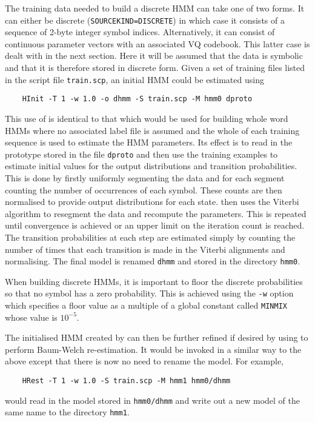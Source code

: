 The training data needed to build a discrete HMM can take one of two forms. It
can either be discrete (\texttt{SOURCEKIND=DISCRETE}) in which case it consists
of a sequence of 2-byte integer symbol indices.  Alternatively, it can consist
of continuous parameter vectors with an associated VQ codebook.  This latter
case is dealt with in the next section.  Here it will be assumed that the data
is symbolic and that it is therefore stored in discrete form. Given a set of training files listed in the script file
\texttt{train.scp}, an initial HMM could be estimated using
\begin{verbatim}
    HInit -T 1 -w 1.0 -o dhmm -S train.scp -M hmm0 dproto
\end{verbatim}
This use of  is identical to that which would be
used for building whole word HMMs where no associated label file is
assumed and the whole of each training sequence is used to estimate
the HMM parameters.  Its effect is to read in the prototype
stored in the file \texttt{dproto} and then use the training examples
to estimate initial values for the output distributions
and transition probabilities.  This is done by firstly uniformly 
segmenting the data and for each segment counting the number of occurrences
of each symbol.  These counts are then normalised to provide output distributions
for each state.   then uses the Viterbi algorithm to resegment
the data and recompute the parameters.  This is repeated until convergence
is achieved or an upper limit on the iteration count is reached.
The transition probabilities at each step are estimated simply by
counting the number of times that each transition is made in the Viterbi alignments
and normalising.  The final model is renamed \texttt{dhmm} and stored in
the directory \texttt{hmm0}.

When building discrete HMMs, it is important to floor the discrete
probabilities so that no symbol has a zero probability.  This is 
achieved using the \texttt{-w} option which specifies a floor value
as a multiple of a global constant called \texttt{MINMIX} whose
value is $10^{-5}$. 

The initialised HMM created by  
can then be further refined if desired by using 
to perform Baum-Welch re-estimation.  It would be invoked in a similar
way to the above except that there is now no need to rename the model.
For example,
\begin{verbatim}
    HRest -T 1 -w 1.0 -S train.scp -M hmm1 hmm0/dhmm
\end{verbatim}
would read in the model stored in \texttt{hmm0/dhmm} and write out a new
model of the same name to the directory \texttt{hmm1}.

